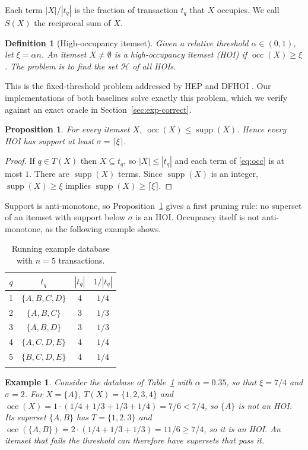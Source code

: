 \documentclass[pdflatex,sn-mathphys,Numbered]{sn-jnl}
\theoremstyle{thmstyleone}
\newtheorem{proposition}[theorem]{Proposition}
\theoremstyle{thmstyletwo}
\newtheorem{example}{Example}
\theoremstyle{thmstylethree}
\newtheorem{definition}{Definition}
\newcommand{\supp}{\operatorname{supp}}
\newcommand{\socc}{\operatorname{occ}}
\begin{document}
Each term $|X|/|t_q|$ is the fraction of transaction $t_q$ that $X$ occupies. We call $S(X)$ the reciprocal sum of $X$.

\begin{definition}[High-occupancy itemset]\label{def:hoi}
Given a relative threshold $\alpha \in (0,1)$, let $\xi = \alpha n$. An itemset $X \neq \emptyset$ is a high-occupancy itemset (HOI) if $\socc(X) \ge \xi$. The problem is to find the set $\mathcal{H}$ of all HOIs.
\end{definition}

This is the fixed-threshold problem addressed by HEP \cite{deng2020hoi} and DFHOI \cite{nguyen2023dfhoi}. Our implementations of both baselines solve exactly this problem, which we verify against an exact oracle in Section~\ref{sec:exp-correct}.

\begin{proposition}\label{prop:occ-supp}
For every itemset $X$, $\socc(X) \le \supp(X)$. Hence every HOI has support at least $\sigma = \lceil \xi \rceil$.
\end{proposition}
\begin{proof}
If $q \in T(X)$ then $X \subseteq t_q$, so $|X| \le |t_q|$ and each term of \eqref{eq:occ} is at most $1$. There are $\supp(X)$ terms. Since $\supp(X)$ is an integer, $\supp(X) \ge \xi$ implies $\supp(X) \ge \lceil \xi \rceil$.
\end{proof}

Support is anti-monotone, so Proposition~\ref{prop:occ-supp} gives a first pruning rule: no superset of an itemset with support below $\sigma$ is an HOI. Occupancy itself is not anti-monotone, as the following example shows.

\begin{table}[t]
\caption{Running example database with $n = 5$ transactions.}\label{tab:example}
\centering
\begin{tabular}{@{}cccc@{}}
\toprule
$q$ & $t_q$ & $|t_q|$ & $1/|t_q|$ \\
\midrule
1 & $\{A, B, C, D\}$ & 4 & $1/4$ \\
2 & $\{A, B, C\}$ & 3 & $1/3$ \\
3 & $\{A, B, D\}$ & 3 & $1/3$ \\
4 & $\{A, C, D, E\}$ & 4 & $1/4$ \\
5 & $\{B, C, D, E\}$ & 4 & $1/4$ \\
\botrule
\end{tabular}
\end{table}

\begin{example}\label{ex:basic}
Consider the database of Table~\ref{tab:example} with $\alpha = 0.35$, so that $\xi = 7/4$ and $\sigma = 2$. For $X = \{A\}$, $T(X) = \{1,2,3,4\}$ and $\socc(X) = 1 \cdot (1/4 + 1/3 + 1/3 + 1/4) = 7/6 < 7/4$, so $\{A\}$ is not an HOI. Its superset $\{A,B\}$ has $T = \{1,2,3\}$ and $\socc(\{A,B\}) = 2 \cdot (1/4 + 1/3 + 1/3) = 11/6 \ge 7/4$, so it is an HOI. An itemset that fails the threshold can therefore have supersets that pass it.
\end{example}
\end{document}
